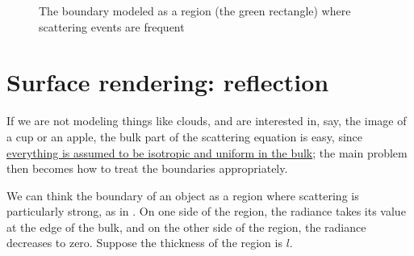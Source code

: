 \documentclass[hyperref, a4paper]{article}
\begin{document}
\begin{figure}
    \centering
    
    \caption{The boundary modeled as a region (the green rectangle) where scattering events are frequent}
    \label{fig:boundary-scattering}
\end{figure}

\section{Surface rendering: reflection}

If we are not modeling things like clouds, 
and are interested in, say, the image of a cup or an apple, 
the bulk part of the scattering equation is easy, 
since \ul{everything is assumed to be isotropic and uniform in the bulk};
the main problem then becomes how to treat the boundaries appropriately.

We can think the boundary of an object as a region where 
scattering is particularly strong, 
as in .
On one side of the region, 
the radiance takes its value at the edge of the bulk, 
and on the other side of the region, 
the radiance decreases to zero. 
Suppose the thickness of the region is $l$.
\end{document}
